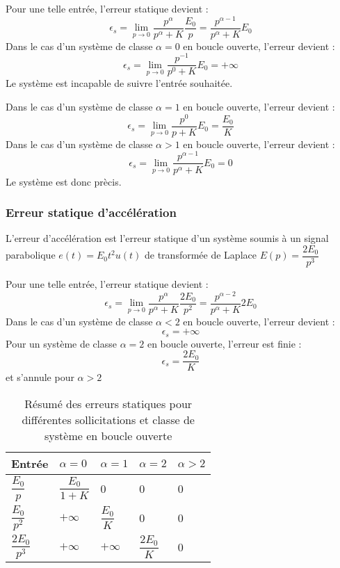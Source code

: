Pour une telle entrée, l'erreur statique devient :
\[
\epsilon_s=\lim\limits_{p\to 0} \dfrac{p^\alpha}{p^\alpha+K}\dfrac{E_0}{p}
          =\dfrac{p^{\alpha-1}}{p^\alpha+K}E_0 
\]
Dans le cas d'un système de classe $\alpha=0$ en boucle ouverte, 
l'erreur devient :
\[
\epsilon_s=\lim\limits_{p\to 0}\dfrac{p^{-1}}{p^0+K}E_0=+\infty
\]
Le système est incapable de suivre l'entrée souhaitée.

Dans le cas d'un système de classe $\alpha=1$ en boucle ouverte, 
l'erreur devient :
\[
\epsilon_s=\lim\limits_{p\to 0}\dfrac{p^0}{p+K}E_0=\dfrac{E_0}{K}
\]
Dans le cas d'un système de classe $\alpha>1$ en boucle ouverte, 
l'erreur devient :
\[
\epsilon_s=\lim\limits_{p\to 0}\dfrac{p^{\alpha-1}}{p^\alpha+K}E_0=0
\]
Le système est donc prècis.
\subsubsection{Erreur statique d'accélération}
L'erreur d'accélération est l'erreur statique d'un système soumis à un signal
parabolique $e(t)=E_0t^2 u(t)$ de transformée de Laplace 
$E(p)=\dfrac{2E_0}{p^3}$

Pour une telle entrée, l'erreur statique devient :
\[
\epsilon_s=\lim\limits_{p\to 0}\dfrac{p^\alpha}{p^\alpha+K}\dfrac{2E_0}{p^2}
          =\dfrac{p^{\alpha-2}}{p^\alpha+K}2E_0 
\]
Dans le cas d'un système de classe $\alpha<2$ en boucle ouverte, 
l'erreur devient :
\[
\epsilon_s=+\infty
\]
Pour un système de classe $\alpha=2$ en boucle ouverte, 
l'erreur est finie :
\[
\epsilon_s=\dfrac{2E_0}{K}
\]
et s'annule pour $\alpha>2$
\begin{table}
    \centering
    \begin{tabular}{@{}P{2cm}P{2cm}P{2cm}P{2cm}P{2cm}@{}}
    \toprule
    Entrée & $\alpha=0$ & $\alpha=1$ & $\alpha=2$ & $\alpha>2$ \\
    \midrule
    $\dfrac{E_0}{p}$&$\dfrac{E_0}{1+K}$&0&0&0\\
    $\dfrac{E_0}{p^2}$&$+\infty$&$\dfrac{E_0}{K}$&0&0\\
    $\dfrac{2E_0}{p^3}$&$+\infty$&$+\infty$&$\dfrac{2E_0}{K}$&0\\
    \bottomrule
    \end{tabular}
    \caption{Résumé des erreurs statiques pour différentes 
             sollicitations et classe de système en boucle ouverte}
\end{table}
